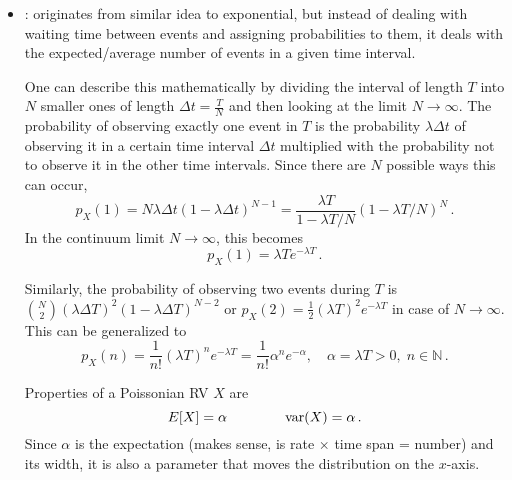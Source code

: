 \begin{ex}
\begin{itemize}


\item {}: originates from similar idea to exponential, but instead of dealing with waiting time between events and assigning probabilities to them, it deals with the expected/average number of events in a given time interval.

One can describe this mathematically by dividing the interval of length $T$ into $N$ smaller ones of length $\Delta t = \frac{T}{N}$ and then looking at the limit $N \rightarrow \infty$. The probability of observing exactly one event in $T$ is the probability $\lambda \Delta t$ of observing it in a certain time interval $\Delta t$ multiplied with the probability not to observe it in the other time intervals. Since there are $N$ possible ways this can occur,
\begin{equation*}
p_X(1) = N \lambda \Delta t (1 - \lambda \Delta t)^{N - 1} = \frac{\lambda T}{1 - \lambda T/ N} (1 - \lambda T/ N)^N \, .
\end{equation*}
In the continuum limit $N \rightarrow \infty$, this becomes
\begin{equation*}
p_X(1) = \lambda T e^{- \lambda T} \, .
\end{equation*}

Similarly, the probability of observing two events during $T$ is $\binom{N}{2} (\lambda \Delta T)^2 (1 - \lambda \Delta T)^{N - 2}$ or $p_X(2) = \frac{1}{2} (\lambda T)^2 e^{- \lambda T}$ in case of $N \rightarrow \infty$. This can be generalized to
\begin{equation}
p_X(n) = \frac{1}{n!} (\lambda T)^n e^{- \lambda T} = \frac{1}{n!} \alpha^n e^{- \alpha}, \quad \alpha = \lambda T > 0, \; n \in \mathbb{N} \, .
\end{equation}



Properties of a Poissonian RV $X$ are
\begin{equation}
E[X] = \alpha \qquad \qquad \operatorname{var}(X) = \alpha \, .
\end{equation}
Since $\alpha$ is the expectation (makes sense, is rate $\times$ time span = number) and its width, it is also a parameter that moves the distribution on the $x$-axis.%



\end{itemize}
\end{ex}
